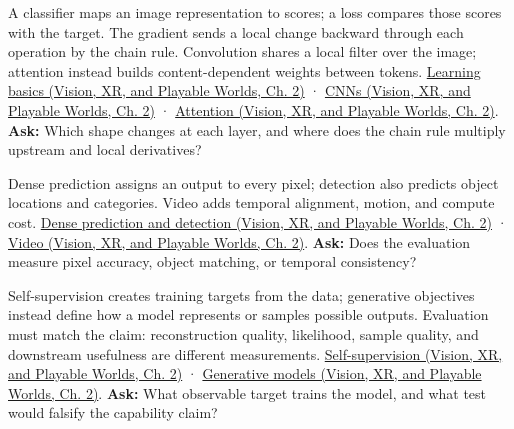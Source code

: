 A classifier maps an image representation to scores; a loss compares those scores with the target. The gradient sends a local change backward through each operation by the chain rule. Convolution shares a local filter over the image; attention instead builds content-dependent weights between tokens. \href{../07-Vision-XR-and-Playable-Worlds/main.pdf\#nameddest=04-visual-computing-ii-ch031-learning-a-visual-classifier-from-examples}{Learning basics (Vision, XR, and Playable Worlds, Ch. 2)} · \href{../07-Vision-XR-and-Playable-Worlds/main.pdf\#nameddest=04-visual-computing-ii-ch031-convolutional-models-preserve-image-neighborhoods}{CNNs (Vision, XR, and Playable Worlds, Ch. 2)} · \href{../07-Vision-XR-and-Playable-Worlds/main.pdf\#nameddest=04-visual-computing-ii-ch031-sequence-models-and-attention}{Attention (Vision, XR, and Playable Worlds, Ch. 2)}. \textbf{Ask:} Which shape changes at each layer, and where does the chain rule multiply upstream and local derivatives?

Dense prediction assigns an output to every pixel; detection also predicts object locations and categories. Video adds temporal alignment, motion, and compute cost. \href{../07-Vision-XR-and-Playable-Worlds/main.pdf\#nameddest=04-visual-computing-ii-ch031-predict-pixels-and-localize-objects}{Dense prediction and detection (Vision, XR, and Playable Worlds, Ch. 2)} · \href{../07-Vision-XR-and-Playable-Worlds/main.pdf\#nameddest=04-visual-computing-ii-ch031-video-adds-motion-and-temporal-cost}{Video (Vision, XR, and Playable Worlds, Ch. 2)}. \textbf{Ask:} Does the evaluation measure pixel accuracy, object matching, or temporal consistency?

Self-supervision creates training targets from the data; generative objectives instead define how a model represents or samples possible outputs. Evaluation must match the claim: reconstruction quality, likelihood, sample quality, and downstream usefulness are different measurements. \href{../07-Vision-XR-and-Playable-Worlds/main.pdf\#nameddest=04-visual-computing-ii-ch031-self-supervision-and-evaluation}{Self-supervision (Vision, XR, and Playable Worlds, Ch. 2)} · \href{../07-Vision-XR-and-Playable-Worlds/main.pdf\#nameddest=04-visual-computing-ii-ch031-generative-models-learn-distributions-and-samplers}{Generative models (Vision, XR, and Playable Worlds, Ch. 2)}. \textbf{Ask:} What observable target trains the model, and what test would falsify the capability claim?

